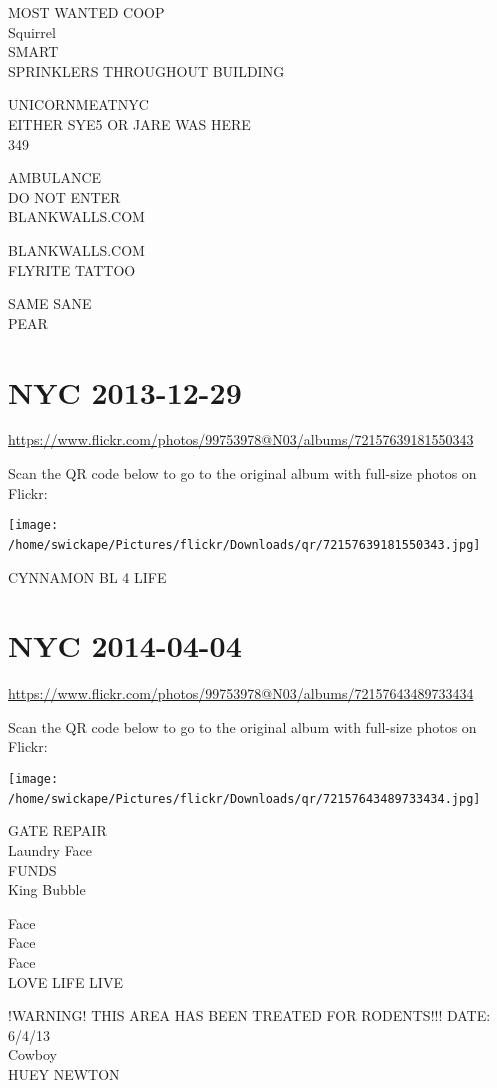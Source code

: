 \documentclass[10pt,letterpaper]{article}
\begin{document}
MOST WANTED COOP\\
Squirrel\\
SMART\\
SPRINKLERS THROUGHOUT BUILDING

UNICORNMEATNYC\\
EITHER SYE5 OR JARE WAS HERE\\
349

AMBULANCE\\
DO NOT ENTER\\
BLANKWALLS.COM

BLANKWALLS.COM\\
FLYRITE TATTOO

SAME SANE\\
PEAR
\

\section*{NYC 2013-12-29}

\url{https://www.flickr.com/photos/99753978@N03/albums/72157639181550343}

Scan the QR code below to go to the original album with full-size photos on Flickr:

\texttt{[image: /home/swickape/Pictures/flickr/Downloads/qr/72157639181550343.jpg]}
\

CYNNAMON BL 4 LIFE
\

\section*{NYC 2014-04-04}

\url{https://www.flickr.com/photos/99753978@N03/albums/72157643489733434}

Scan the QR code below to go to the original album with full-size photos on Flickr:

\texttt{[image: /home/swickape/Pictures/flickr/Downloads/qr/72157643489733434.jpg]}
\

GATE REPAIR\\
Laundry Face\\
FUNDS\\
King Bubble

Face\\
Face\\
Face\\
LOVE LIFE LIVE

!WARNING! THIS AREA HAS BEEN TREATED FOR RODENTS!!! DATE: 6/4/13\\
Cowboy\\
HUEY NEWTON
\end{document}
